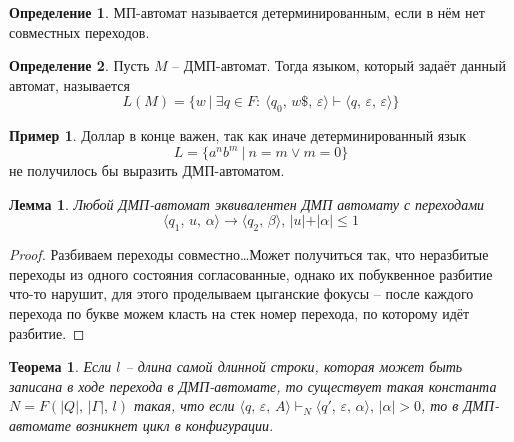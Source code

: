 \documentclass[a4paper,12pt]{article}
\renewcommand{\leq}{\ensuremath{\leqslant}}
\theoremstyle{plain}
\newtheorem{theorem}{Теорема}[subsection]
\newtheorem{lemma}{Лемма}[subsection]
\theoremstyle{definition}
\newtheorem{definition}{Определение}[subsection]
\newtheorem*{example}{Пример}
\theoremstyle{remark}
\begin{document}
\begin{definition}
	МП-автомат называется детерминированным, если в нём нет совместных переходов.
\end{definition}

\begin{definition}
	Пусть $M$ -- ДМП-автомат. Тогда языком, который задаёт данный автомат, называется
	\[
		L(M) = \{w \:\vert\: \exists q \in F :\: \langle q_0,\,w\$,\,\varepsilon\rangle\vdash\langle q,\,\varepsilon,\,\varepsilon\rangle\}
	\]
\end{definition}

\begin{example}
	Доллар в конце важен, так как иначе детерминированный язык
	\[
		L = \{a^nb^m \:\vert\: n = m \lor m = 0\}
	\]
	не получилось бы выразить ДМП-автоматом.
\end{example}

\begin{lemma}
	Любой ДМП-автомат эквивалентен ДМП автомату с переходами
	\[
		\langle q_1,\,u,\,\alpha\rangle\to\langle q_2,\,\beta\rangle,\, \vert u\vert +\vert \alpha\vert \leq 1
	\]
\end{lemma}

\begin{proof}
	Разбиваем переходы совместно\dots Может получиться так, что неразбитые переходы из одного состояния согласованные, однако их побуквенное разбитие что-то нарушит, для этого проделываем цыганские фокусы -- после каждого перехода по букве можем класть на стек номер перехода, по которому идёт разбитие.
\end{proof}

\begin{theorem}
	Если $l$ -- длина самой длинной строки, которая может быть записана в ходе перехода в ДМП-автомате, то существует такая константа $N = F(\vert Q\vert,\, \vert \Gamma\vert,\, l)$ такая, что если $\langle q,\,\varepsilon,\, A\rangle \vdash_N\langle q',\,\varepsilon,\, \alpha\rangle,\, \vert \alpha\vert > 0$, то в ДМП-автомате возникнет цикл в конфигурации.
\end{theorem}
\end{document}
